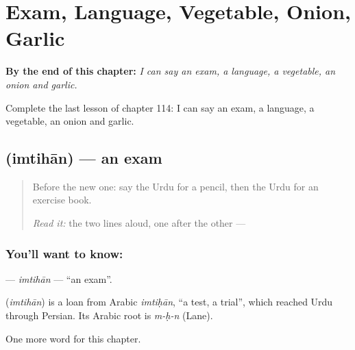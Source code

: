 
\chapter{Exam, Language, Vegetable, Onion, Garlic}
\label{ch:ur-exam-language-vegetable-onion-garlic}

\begin{chapteropening}
\textbf{By the end of this chapter:} \emph{I can say an exam, a language, a vegetable, an onion and garlic.}

Complete the last lesson of chapter 114: I can say an exam, a language, a vegetable, an onion and garlic.
\end{chapteropening}

\section[\texorpdfstring{\ur{امتحان} (imtihān)}{امتحان (imtihān)}]{ (imtihān) — an exam}

\label{lesson:UR-C114-imtihan}



\begin{quote}
Before the new one: say the Urdu for a pencil, then the Urdu for an exercise book.

\emph{Read it:} the two lines aloud, one after the other — \textbf{     }
\end{quote}

\subsection*{You'll want to know: }
\textbf{} — \emph{imtihān} — \textquotedblleft{}an exam\textquotedblright{}.

\begin{cousinweb}
\textbf{} (\emph{imtihān}) is a loan from Arabic \emph{imtiḥān}, \textquotedblleft{}a test, a trial\textquotedblright{}, which reached Urdu through Persian. Its Arabic root is \emph{m-ḥ-n} (Lane).
\end{cousinweb}

\begin{grammarlens}[title={What you've built}]
One more word for this chapter.
\end{grammarlens}

